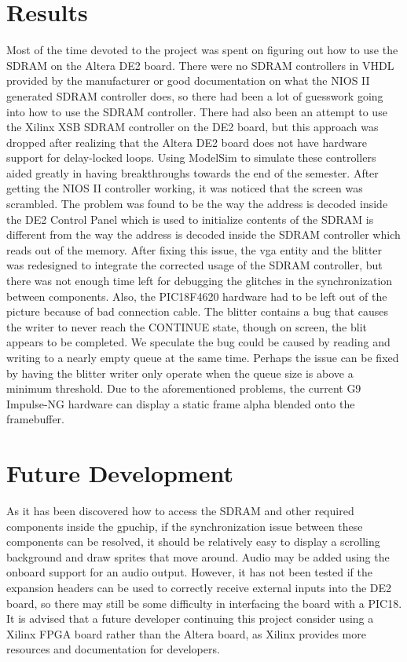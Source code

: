\documentclass{report}
\begin{document}
\section{Results}
Most of the time devoted to the project was spent on figuring out how to 
use the SDRAM on the Altera DE2 board. There were no SDRAM controllers 
in VHDL provided by the manufacturer or good documentation on what the 
NIOS II generated SDRAM controller does, so there had been a lot of 
guesswork going into how to use the SDRAM controller. There had also 
been an attempt to use the Xilinx XSB SDRAM controller on the DE2 board, 
but this approach was dropped after realizing that the Altera DE2 board 
does not have hardware support for delay-locked loops. Using ModelSim to 
simulate these controllers aided greatly in having breakthroughs towards 
the end of the semester. After getting the NIOS II controller working, 
it was noticed that the screen was scrambled. The problem was found to 
be the way the address is decoded inside the DE2 Control Panel which is 
used to initialize contents of the SDRAM is different from the way the 
address is decoded inside the SDRAM controller which reads out of the 
memory. After fixing this issue, the vga entity and the blitter was redesigned to 
integrate the corrected usage of the SDRAM controller, but there was not enough time 
left for debugging the glitches in the synchronization between 
components. Also, the PIC18F4620 hardware had to be left out of the 
picture because of bad connection cable. The blitter contains a bug that 
causes the writer to never reach the CONTINUE state, though on screen, 
the blit appears to be completed. We speculate the bug could be caused 
by reading and writing to a nearly empty queue at the same time.  
Perhaps the issue can be fixed by having the blitter writer only operate 
when the queue size is above a minimum threshold. Due to the 
aforementioned problems, the current G9 Impulse-NG hardware can display 
a static frame alpha blended onto the framebuffer.

\section{Future Development}
As it has been discovered how to access the SDRAM and other required 
components inside the gpuchip, if the synchronization issue between 
these components can be resolved, it should be relatively easy to 
display a scrolling background and draw sprites that move around. Audio 
may be added using the onboard support for an audio output. However, it 
has not been tested if the expansion headers can be used to correctly 
receive external inputs into the DE2 board, so there may still be some 
difficulty in interfacing the board with a PIC18. It is advised that a 
future developer continuing this project consider using a Xilinx FPGA 
board rather than the Altera board, as Xilinx provides more resources 
and documentation for developers.
\end{document}
